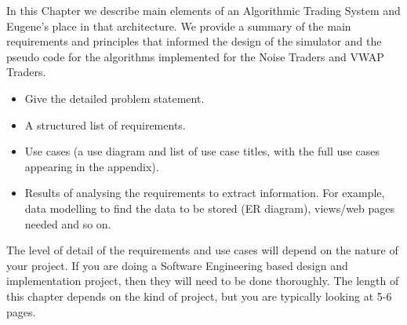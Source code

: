 In this Chapter we describe main elements of an Algorithmic Trading System and Eugene’s place in that architecture. We provide a summary of the main requirements and principles that informed the design of the simulator and the pseudo code for the algorithms implemented for the Noise Traders and VWAP Traders.

\begin{itemize}
\item Give the detailed problem statement.
\item A structured list of requirements.
\item Use cases (a use diagram and list of use case titles, with the full use cases appearing in the appendix).
\item Results of analysing the requirements to extract information. For example, data modelling to find the data to be stored (ER diagram), views/web pages needed and so on.
\end{itemize}
The level of detail of the requirements and use cases will depend on the nature of your project. If you are doing a Software Engineering based design and implementation project, then they will need to be done thoroughly.
The length of this chapter depends on the kind of project, but you are typically looking at 5-6 pages.
